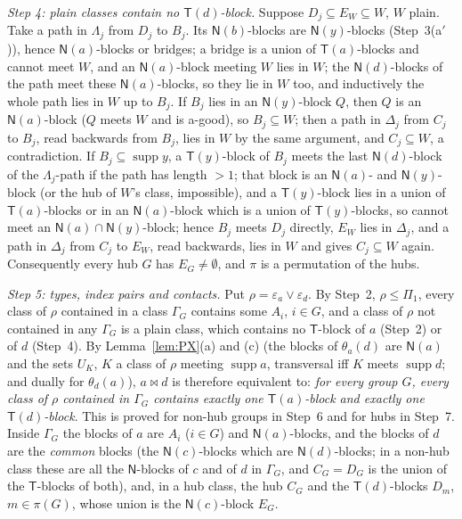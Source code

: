 \documentclass[11pt]{amsart}
\theoremstyle{definition}
\newcommand{\supp}{\operatorname{supp}}
\newcommand{\T}{\mathsf{T}}
\newcommand{\N}{\mathsf{N}}
\begin{document}
\smallskip
\emph{Step 4: plain classes contain no $\T(d)$-block.} Suppose $D_j\subseteq E_W\subseteq W$, $W$ plain. Take a path in $\Lambda_j$ from $D_j$ to $B_j$. Its $\N(b)$-blocks are $\N(y)$-blocks (Step~3(a$'$)), hence $\N(a)$-blocks or bridges; a bridge is a union of $\T(a)$-blocks and cannot meet $W$, and an $\N(a)$-block meeting $W$ lies in $W$; the $\N(d)$-blocks of the path meet these $\N(a)$-blocks, so they lie in $W$ too, and inductively the whole path lies in $W$ up to $B_j$. If $B_j$ lies in an $\N(y)$-block $Q$, then $Q$ is an $\N(a)$-block ($Q$ meets $W$ and is a-good), so $B_j\subseteq W$; then a path in $\Delta_j$ from $C_j$ to $B_j$, read backwards from $B_j$, lies in $W$ by the same argument, and $C_j\subseteq W$, a contradiction. If $B_j\subseteq\supp y$, a $\T(y)$-block of $B_j$ meets the last $\N(d)$-block of the $\Lambda_j$-path if the path has length $>1$; that block is an $\N(a)$- and $\N(y)$-block (or the hub of $W$'s class, impossible), and a $\T(y)$-block lies in a union of $\T(a)$-blocks or in an $\N(a)$-block which is a union of $\T(y)$-blocks, so cannot meet an $\N(a)\cap\N(y)$-block; hence $B_j$ meets $D_j$ directly, $E_W$ lies in $\Delta_j$, and a path in $\Delta_j$ from $C_j$ to $E_W$, read backwards, lies in $W$ and gives $C_j\subseteq W$ again. Consequently every hub $G$ has $E_G\ne\emptyset$, and $\pi$ is a permutation of the hubs.

\smallskip
\emph{Step 5: types, index pairs and contacts.} Put $\rho=\varepsilon_a\vee\varepsilon_d$. By Step~2, $\rho\le\Pi_1$, every class of $\rho$ contained in a class $\Gamma_G$ contains some $A_i$, $i\in G$, and a class of $\rho$ not contained in any $\Gamma_G$ is a plain class, which contains no $\T$-block of $a$ (Step~2) or of $d$ (Step~4). By Lemma~\ref{lem:PX}(a) and (c) (the blocks of $\theta_a(d)$ are $\N(a)$ and the sets $U_K$, $K$ a class of $\rho$ meeting $\supp a$, transversal iff $K$ meets $\supp d$; and dually for $\theta_d(a)$), $a\bowtie d$ is therefore equivalent to: \emph{for every group $G$, every class of $\rho$ contained in $\Gamma_G$ contains exactly one $\T(a)$-block and exactly one $\T(d)$-block}. This is proved for non-hub groups in Step~6 and for hubs in Step~7. Inside $\Gamma_G$ the blocks of $a$ are $A_i$ ($i\in G$) and $\N(a)$-blocks, and the blocks of $d$ are the \emph{common} blocks (the $\N(c)$-blocks which are $\N(d)$-blocks; in a non-hub class these are all the $\N$-blocks of $c$ and of $d$ in $\Gamma_G$, and $C_G=D_G$ is the union of the $\T$-blocks of both), and, in a hub class, the hub $C_G$ and the $\T(d)$-blocks $D_m$, $m\in\pi(G)$, whose union is the $\N(c)$-block $E_G$.
\end{document}
